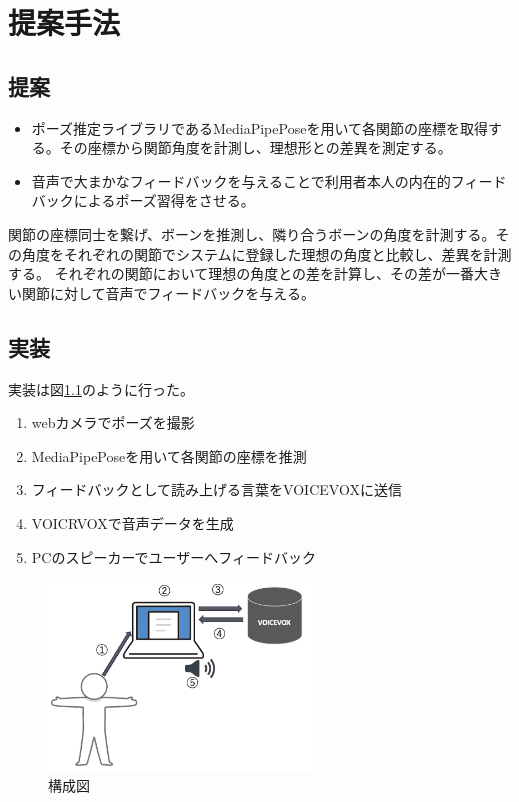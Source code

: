 \chapter{提案手法}
\label{proposed}
\section{提案}
\begin{itemize}
  \item ポーズ推定ライブラリであるMediaPipePose\cite{mediapipe_pose_landmarker}を用いて各関節の座標を取得する。その座標から関節角度を計測し、理想形との差異を測定する。
  \item 音声で大まかなフィードバックを与えることで利用者本人の内在的フィードバックによるポーズ習得をさせる。
\end{itemize}
関節の座標同士を繋げ、ボーンを推測し、隣り合うボーンの角度を計測する。その角度をそれぞれの関節でシステムに登録した理想の角度と比較し、差異を計測する。
それぞれの関節において理想の角度との差を計算し、その差が一番大きい関節に対して音声でフィードバックを与える。

\section{実装}
実装は図\ref{fig:system_figure}のように行った。
\begin{enumerate}
  \item webカメラでポーズを撮影
  \item MediaPipePoseを用いて各関節の座標を推測
  \item フィードバックとして読み上げる言葉をVOICEVOXに送信
  \item VOICRVOXで音声データを生成
  \item PCのスピーカーでユーザーへフィードバック
  \end{enumerate}

\begin{figure}[htbp]
  \begin{center}
      \includegraphics[width=7cm]{figures/system_figure.png}
      \caption{構成図}
      \label{fig:system_figure}
  \end{center}
\end{figure}

